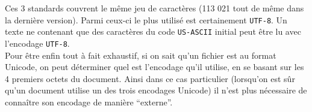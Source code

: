 Ces 3 standards couvrent le même jeu de caractères (113 021 tout de même
dans la dernière version). Parmi ceux-ci le plus utilisé est
certainement \texttt{UTF-8}. Un texte ne contenant que des caractères du
code \texttt{US-ASCII} initial peut être lu avec l'encodage
\texttt{UTF-8}.\\

Pour être enfin tout à fait exhaustif, si on sait qu'un fichier est au
format Unicode, on peut déterminer quel est l'encodage qu'il utilise, en
se basant sur les 4 premiers octets du document. Ainsi dans ce cas
particulier (lorsqu'on est sûr qu'un document utilise un des trois
encodages Unicode) il n'est plus nécessaire de connaître son encodage de
manière ``externe''.